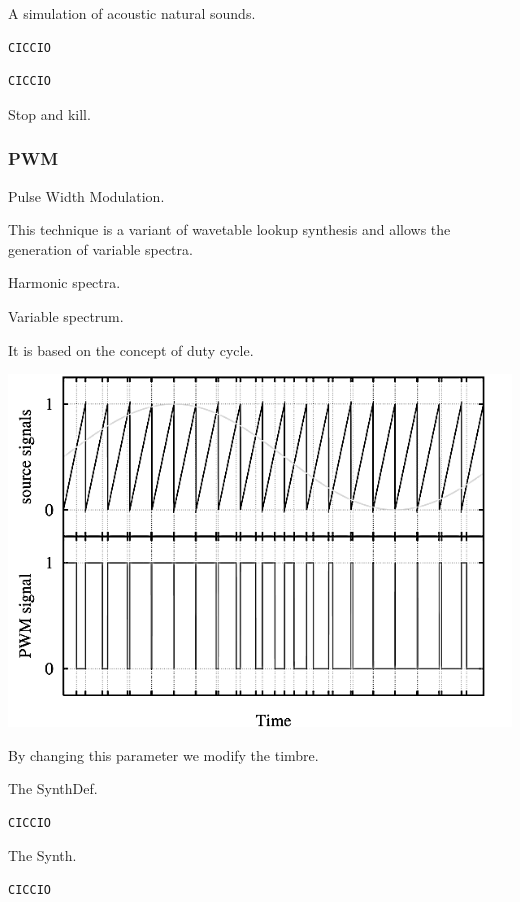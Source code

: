 A simulation of acoustic natural sounds.

\begin{lstlisting}[frame=single] 
CICCIO
\end{lstlisting}

\begin{lstlisting}[frame=single] 
CICCIO
\end{lstlisting}

Stop and kill.

\subsubsection{PWM}\label{pwm}

Pulse Width Modulation.

This technique is a variant of wavetable lookup synthesis and allows the generation of variable spectra.

Harmonic spectra.

Variable spectrum.

It is based on the concept of duty cycle.

\begin{center}
\includegraphics[scale=0.4]{../img/pwm.png}
\end{center}

By changing this parameter we modify the timbre.

The SynthDef.

\begin{lstlisting}[frame=single] 
CICCIO
\end{lstlisting}

The Synth.

\begin{lstlisting}[frame=single] 
CICCIO
\end{lstlisting}

